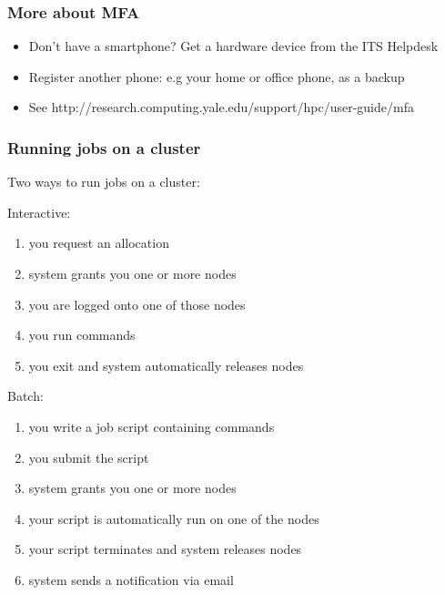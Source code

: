 \documentclass[10pt]{beamer}
\begin{document}
\begin{frame}[fragile]
\frametitle{More about MFA}

\begin{itemize}
\item Don't have a smartphone? Get a hardware device from the ITS Helpdesk
\item Register another phone: e.g your home or office phone, as a backup
\item See http://research.computing.yale.edu/support/hpc/user-guide/mfa
\end{itemize}


\end{frame}
\begin{frame}[fragile]
\frametitle{Running jobs on a cluster}

Two ways to run jobs on a cluster:

Interactive:
\begin{enumerate}
\item you request an allocation
\item system grants you one or more nodes
\item you are logged onto one of those nodes
\item you run commands
\item you exit and system automatically releases nodes
\end{enumerate}

Batch:
\begin{enumerate}
\item you write a job script containing commands
\item you submit the script
\item system grants you one or more nodes
\item your script is automatically run on one of the nodes
\item your script terminates and system releases nodes
\item system sends a notification via email
\end{enumerate}

\end{frame}
\end{document}
